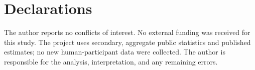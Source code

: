 \section*{Declarations}

The author reports no conflicts of interest. No external funding was
received for this study. The project uses secondary, aggregate public
statistics and published estimates; no new human-participant data were
collected. The author is responsible for the analysis, interpretation,
and any remaining errors.
